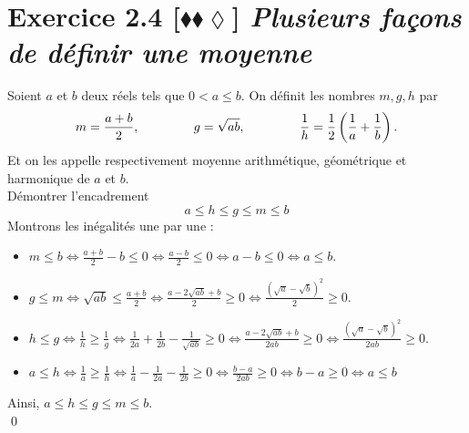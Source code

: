 \documentclass[10pt]{article}
\begin{document}
\section*{Exercice 2.4 [$\blacklozenge\blacklozenge\lozenge$] \emph{Plusieurs façons de définir une moyenne}}
\begin{tcolorbox}[enhanced, width=7in, center, size=fbox, fontupper=\large, drop shadow southwest]
    Soient $a$ et $b$ deux réels tels que $0 < a \leq b$. On définit les nombres $m,g,h$ par
    \begin{equation*}
        m=\frac{a+b}{2}, \hspace{1.5cm} g=\sqrt{ab}, \hspace{1.5cm} \frac{1}{h}=\frac{1}{2}\left(\frac{1}{a}+\frac{1}{b}\right).
    \end{equation*}
    Et on les appelle respectivement moyenne arithmétique, géométrique et harmonique de $a$ et $b$.\\
    Démontrer l'encadrement
    \begin{equation*}
        a \leq h \leq g \leq m \leq b
    \end{equation*}
    Montrons les inégalités une par une :
    \begin{itemize}
        \item $m \leq b \iff \frac{a+b}{2}-b\leq 0 \iff \frac{a-b}{2} \leq 0 \iff a - b \leq 0 \iff a \leq b$.
        \item $g \leq m \iff \sqrt{ab} \leq \frac{a+b}{2} \iff \frac{a - 2\sqrt{ab} + b}{2} \geq 0 \iff \frac{(\sqrt{a}-\sqrt{b})^2}{2} \geq 0$.
        \item $h \leq g \iff \frac{1}{h} \geq \frac{1}{g} \iff \frac{1}{2a}+\frac{1}{2b}-\frac{1}{\sqrt{ab}} \geq 0 \iff \frac{a-2\sqrt{ab}+b}{2ab} \geq 0 \iff \frac{(\sqrt{a}-\sqrt{b})^2}{2ab}\geq0$.
        \item $a \leq h \iff \frac{1}{a} \geq \frac{1}{h} \iff \frac{1}{a}-\frac{1}{2a}-\frac{1}{2b}\geq 0 \iff \frac{b-a}{2ab}\geq0 \iff b-a\geq 0 \iff a \leq b$
    \end{itemize}
    Ainsi, $a\leq h \leq g \leq m \leq b$.\\
    \qed
\end{tcolorbox}

\end{document}
